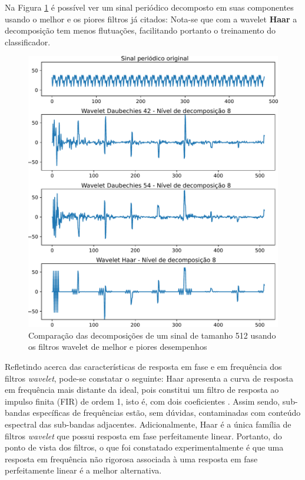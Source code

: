 	\par Na Figura \ref{fig:haardaub42comparison} é possível ver um sinal periódico decomposto em suas componentes usando o melhor e os piores filtros já citados: Nota-se que com a wavelet \textbf{Haar} a decomposição tem menos flutuações, facilitando portanto o treinamento do classificador.

	\begin{figure}[H]
		\centering
		\includegraphics[scale=.6]{images/results/haarDaubComparison/haarDaub42Comparison}
		\caption{Comparação das decomposições de um sinal de tamanho 512 usando os filtros wavelet de melhor e piores desempenhos }
		\label{fig:haardaub42comparison}
	\end{figure}
		
	\par Refletindo acerca das características de resposta em fase e em frequência dos filtros \textit{wavelet}, pode-se constatar o seguinte: Haar apresenta a curva de resposta em frequência mais distante da ideal, pois constitui um filtro de resposta ao impulso finita (FIR) de ordem 1, isto é, com dois coeficientes \cite{WaveletPropertiesBrowser}. Assim sendo, sub-bandas específicas de frequências estão, sem dúvidas, contaminadas com conteúdo espectral das sub-bandas adjacentes. Adicionalmente, Haar é a única família de filtros \textit{wavelet} que possui resposta em fase perfeitamente linear. Portanto, do ponto de vista dos filtros, o que foi constatado experimentalmente é que uma resposta em frequência não rigorosa associada à uma resposta em fase perfeitamente linear é a melhor alternativa.
	
